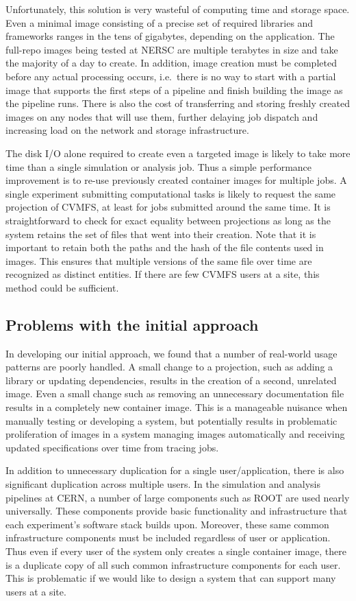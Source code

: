 \documentclass[sigconf]{acmart}
\begin{document}
Unfortunately, this solution is very wasteful of computing time and storage space.
Even a minimal image consisting of a precise set of required libraries and frameworks ranges in the tens of gigabytes,
depending on the application.
The full-repo images being tested at NERSC are multiple terabytes in size and take the majority of a day to create.
In addition, image creation must be completed before any actual processing occurs,
i.e.\ there is no way to start with a partial image that supports the first steps of a pipeline and finish building the image as the pipeline runs.
There is also the cost of transferring and storing freshly created images on any nodes that will use them,
further delaying job dispatch and increasing load on the network and storage infrastructure.

The disk I/O alone required to create even a targeted image is likely to take more time than a single simulation or analysis job.
Thus a simple performance improvement is to re-use previously created container images for multiple jobs.
A single experiment submitting computational tasks is likely to request the same projection of CVMFS,
at least for jobs submitted around the same time.
It is straightforward to check for exact equality between projections as long as the system retains the set of files that went into their creation.
Note that it is important to retain both the paths and the hash of the file contents used in images.
This ensures that multiple versions of the same file over time are recognized as distinct entities.
If there are few CVMFS users at a site,
this method could be sufficient.

\subsection{Problems with the initial approach}

In developing our initial approach,
we found that a number of real-world usage patterns are poorly handled.
A small change to a projection,
such as adding a library or updating dependencies,
results in the creation of a second, unrelated image.
Even a small change such as removing an unnecessary documentation file results in a completely new container image.
This is a manageable nuisance when manually testing or developing a system,
but potentially results in problematic proliferation of images in a system managing images automatically and receiving updated specifications over time from tracing jobs.

In addition to unnecessary duplication for a single user/application,
there is also significant duplication across multiple users.
In the simulation and analysis pipelines at CERN,
a number of large components such as ROOT are used nearly universally.
These components provide basic functionality and infrastructure that each experiment's software stack builds upon.
Moreover, these same common infrastructure components must be included regardless of user or application.
Thus even if every user of the system only creates a single container image,
there is a duplicate copy of all such common infrastructure components for each user.
This is problematic if we would like to design a system that can support many users at a site.
\end{document}
